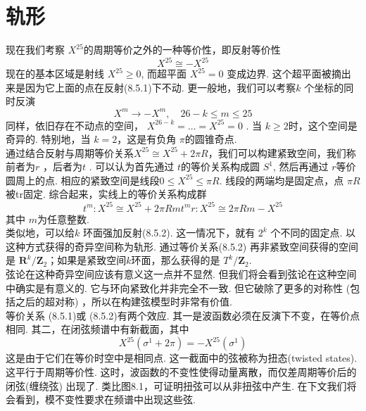 \section{轨形}%
现在我们考察 $X^{25}$的周期等价之外的一种等价性，即反射等价性
\begin{equation}
	X^{25} \cong-X^{25}
\end{equation}
现在的基本区域是射线 $X^{25} \geq 0$, 而超平面 $X^{25}=0$ 变成边界. 这个超平面被摘出来是因为它上面的点在反射(8.5.1)下不动. 更一般地，我们可以考察$k$ 个坐标的同时反演
\begin{equation}
	X^{m} \rightarrow-X^{m}, \quad 26-k \leq m \leq 25
\end{equation}
同样，依旧存在不动点的空间， $X^{26-k}=\ldots=X^{25}=0 $ . 当 $k \geq 2$时，这个空间是奇异的. 特别地，当 $k=2$，这是有负角 $\pi$的圆锥奇点.\\
通过结合反射与周期等价关系$X^{25} \cong X^{25}+2 \pi R $，我们可以构建紧致空间，我们称前者为$r$ ，后者为$t$ . 可以认为首先通过 $t$的等价关系构成圆 $S^{1}$, 然后再通过 $r$等价圆周上的点. 相应的紧致空间是线段$0 \leq X^{25} \leq \pi R$. 线段的两端均是固定点，点 $\pi R$ 被tr固定. 综合起来，实线上的等价关系构成群
\begin{subequations}
\begin{equation}
		t^{m}:  X^{25} \cong X^{25}+2 \pi R m 
\end{equation}
\begin{equation}		
		t^{m} r:  X^{25} \cong 2 \pi R m-X^{25}
\end{equation}
\end{subequations}
其中 $m$为任意整数.\\
类似地，可以给$k$ 环面强加反射(8.5.2). 这一情况下，就有 $2^{k}$ 个不同的固定点. 以这种方式获得的奇异空间称为轨形. 通过等价关系(8.5.2) 再非紧致空间获得的空间是 $\mathbf{R}^{k} / \mathbf{Z}_{2}$；如果是紧致空间$k$环面，那么获得的是 $T^{k} / \mathbf{Z}_{2}$.\\
弦论在这种奇异空间应该有意义这一点并不显然. 但我们将会看到弦论在这种空间中确实是有意义的. 它与环向紧致化并非完全不一致. 但它破除了更多的对称性 (包括之后的超对称) ，所以在构建弦模型时非常有价值.\\
等价关系 (8.5.1)或 (8.5.2)有两个效应. 其一是波函数必须在反演下不变，在等价点相同. 其二，在闭弦频谱中有新截面，其中 
\begin{equation}
	X^{25}\left(\sigma^{1}+2 \pi\right)=-X^{25}\left(\sigma^{1}\right)
\end{equation}
这是由于它们在等价时空中是相同点. 这一截面中的弦被称为扭态(twisted states). 这平行于周期等价性. 这时，波函数的不变性使得动量离散，而仅差周期等价后的闭弦(缠绕弦) 出现了. 类比图8.1，可证明扭弦可以从非扭弦中产生. 在下文我们将会看到，模不变性要求在频谱中出现这些弦.\\
